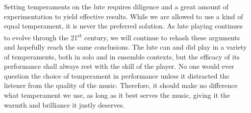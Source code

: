 Setting temperaments on the lute requires diligence and a great amount of experimentation to yield
effective results.  While we are allowed to use a kind of equal temperament, it is never the
preferred solution.  As lute playing continues to evolve through the 21\textsuperscript{st} century,
we will continue to rehash these arguments and hopefully reach the same conclusions. The lute can
and did play in a variety of temperaments, both in solo and in ensemble contexts, but the efficacy
of its performance shall always rest with the skill of the player. No one would ever question the
choice of temperament in performance unless it distracted the listener from the quality of the
music.  Therefore, it should make no difference what temperament we use, as long as it best serves
the music, giving it the warmth and brilliance it justly deserves.

